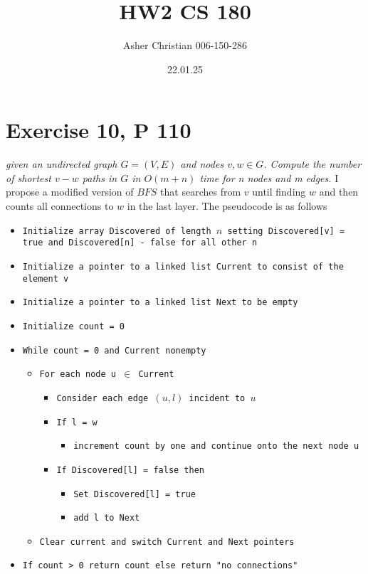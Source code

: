 \documentclass{amsart}
\title{HW2 CS 180}
\author{Asher Christian 006-150-286}
\date{ 22.01.25}
\begin{document}
\maketitle
\section{Exercise 10, P 110}
\emph{given an undirected graph $G = (V,E)$ and nodes $v, w \in G$. Compute
    the number of shortest $v-w$ paths in $G$ in $O(m+n)$ time for n nodes and m edges.
}
I propose a modified version of $BFS$ that searches from $v$ until finding $w$ and then counts
all connections to $w$ in the last layer. The pseudocode is as follows

{\small %
\begin{itemize}
    \item \texttt{Initialize array Discovered of length $n$ setting Discovered[v] = true and Discovered[n] - false for all other n}
    \item \texttt{Initialize a pointer to a linked list Current to consist of the element  v}
    \item \texttt{Initialize a pointer to a linked list Next to be empty}
    \item \texttt{Initialize count = 0}
    \item \texttt{While count = 0 and Current nonempty}
    \begin{itemize}
        \item \texttt{For each node u $\in$ Current}
            \begin{itemize}
                \item \texttt{Consider each edge $(u,l)$ incident to $u$ }
                \item \texttt{If l = w}
                    \begin{itemize}
                        \item \texttt{increment count by one and continue onto the next node u}
                    \end{itemize}
                \item \texttt{If Discovered[l] = false then}
                    \begin{itemize}
                        \item \texttt{Set Discovered[l] = true}
                        \item \texttt{add l to Next}
                    \end{itemize}
            \end{itemize}
        \item \texttt{Clear current and switch Current and Next pointers}
    \end{itemize}
    \item \texttt{If count > 0 return count else return "no connections"}
\end{itemize}
}
\end{document}
